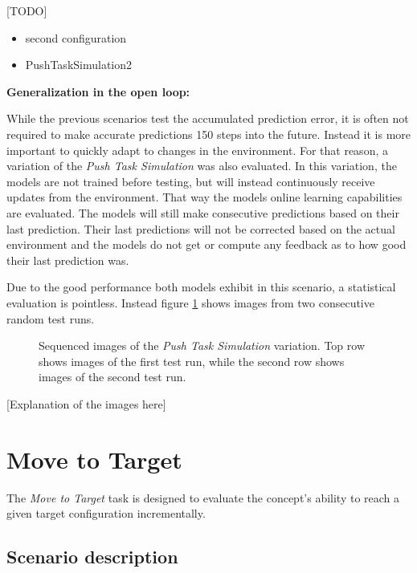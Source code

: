 [TODO]
\begin{itemize}
\item second configuration
\item PushTaskSimulation2
\end{itemize}

\textbf{Generalization in the open loop:}

While the previous scenarios test the accumulated prediction error, it is often not required to make accurate predictions 150 steps into the future. Instead it is more important to quickly adapt to changes in the environment. For that reason, a variation of the \textit{Push Task Simulation} was also evaluated. In this variation, the models are not trained before testing, but will instead continuously receive updates from the environment. That way the models online learning capabilities are evaluated. The models will still make consecutive predictions based on their last prediction. Their last predictions will not be corrected based on the actual environment and the models do not get or compute any feedback as to how good their last prediction was. 

Due to the good performance both models exhibit in this scenario, a statistical evaluation is pointless. Instead figure \ref{fig:pushTaskSim2} shows images from two consecutive random test runs. %

\begin{figure}
\centering
\caption{Sequenced images of the \textit{Push Task Simulation} variation. Top row shows images of the first test run, while the second row shows images of the second test run.}
\label{fig:pushTaskSim2}
\end{figure}

[Explanation of the images here]

\section{Move to Target \label{sec:moveToTarget}}

The \textit{Move to Target} task is designed to evaluate the concept's ability to reach a given target configuration incrementally. 

\subsection{Scenario description}

